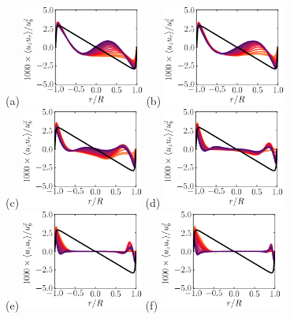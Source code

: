\documentclass[lineno]{jfm}
\begin{document}
       \begin{figure}
       \centering
               (a) \includegraphics[width=4cm]{Figures/prof_rssouter_rotz0_roty0.00390625.eps}
               (b) \includegraphics[width=4cm]{Figures/prof_rssouter_rotz0_roty0.0078125.eps} \\
               (c) \includegraphics[width=4cm]{Figures/prof_rssouter_rotz0_roty0.015625.eps}
               (d) \includegraphics[width=4cm]{Figures/prof_rssouter_rotz0_roty0.03125.eps} \\
               (e) \includegraphics[width=4cm]{Figures/prof_rssouter_rotz0_roty0.0625.eps}
               (f) \includegraphics[width=4cm]{Figures/prof_rssouter_rotz0_roty0.125.eps} \\

\end{figure}
\end{document}
